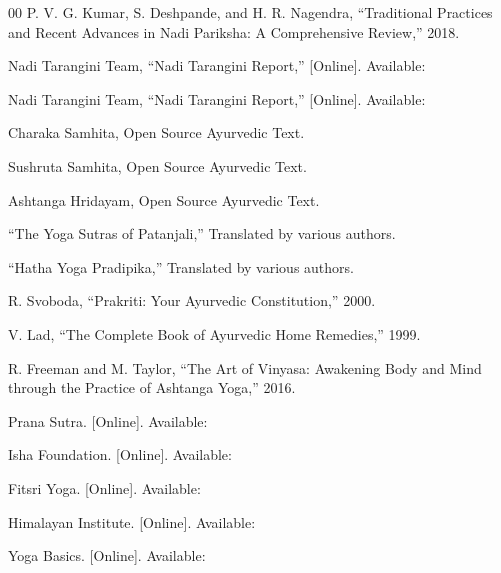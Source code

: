 \documentclass[10pt,twocolumn]{article}
\begin{document}
\begin{thebibliography}{00}
 P. V. G. Kumar, S. Deshpande, and H. R. Nagendra, “Traditional Practices and Recent Advances in Nadi Pariksha: A Comprehensive Review,” 2018.

 Nadi Tarangini Team, “Nadi Tarangini Report,” [Online]. Available: \url{}

 Nadi Tarangini Team, “Nadi Tarangini Report,” [Online]. Available: \url{}

 Charaka Samhita, Open Source Ayurvedic Text.

 Sushruta Samhita, Open Source Ayurvedic Text.

 Ashtanga Hridayam, Open Source Ayurvedic Text.

 “The Yoga Sutras of Patanjali,” Translated by various authors.

 “Hatha Yoga Pradipika,” Translated by various authors.

 R. Svoboda, “Prakriti: Your Ayurvedic Constitution,” 2000.

 V. Lad, “The Complete Book of Ayurvedic Home Remedies,” 1999.

 R. Freeman and M. Taylor, “The Art of Vinyasa: Awakening Body and Mind through the Practice of Ashtanga Yoga,” 2016.

 Prana Sutra. [Online]. Available: \url{}

 Isha Foundation. [Online]. Available: \url{}

 Fitsri Yoga. [Online]. Available: \url{}

 Himalayan Institute. [Online]. Available: \url{}

 Yoga Basics. [Online]. Available: \url{}

\end{thebibliography}
\end{document}
